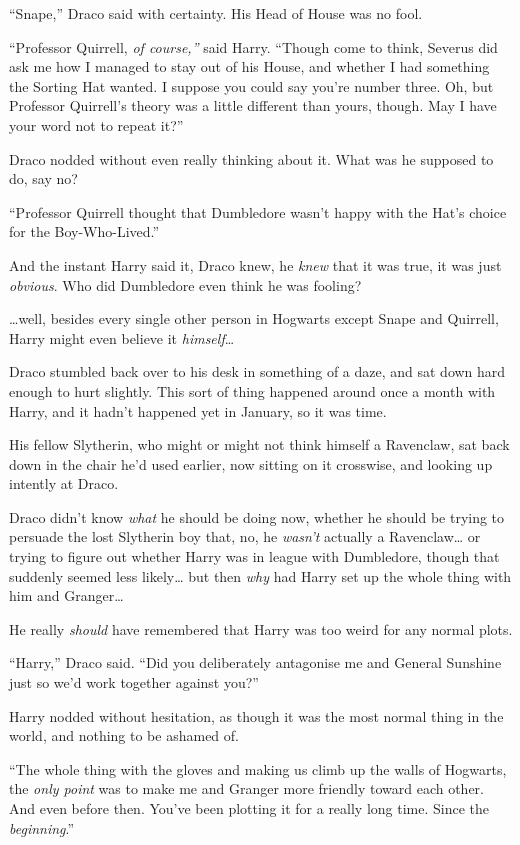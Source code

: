 ``Snape,'' Draco said with certainty. His Head of House was no fool.

``Professor Quirrell, \emph{of course,''} said Harry. ``Though come to
think, Severus did ask me how I managed to stay out of his House, and
whether I had something the Sorting Hat wanted. I suppose you could say
you're number three. Oh, but Professor Quirrell's theory was a little
different than yours, though. May I have your word not to repeat it?''

Draco nodded without even really thinking about it. What was he supposed
to do, say no?

``Professor Quirrell thought that Dumbledore wasn't happy with the Hat's
choice for the Boy-Who-Lived.''

And the instant Harry said it, Draco knew, he \emph{knew} that it was
true, it was just \emph{obvious}. Who did Dumbledore even think he was
fooling?

\ldots{}well, besides every single other person in Hogwarts except Snape
and Quirrell, Harry might even believe it \emph{himself}\ldots{}

Draco stumbled back over to his desk in something of a daze, and sat
down hard enough to hurt slightly. This sort of thing happened around
once a month with Harry, and it hadn't happened yet in January, so it
was time.

His fellow Slytherin, who might or might not think himself a Ravenclaw,
sat back down in the chair he'd used earlier, now sitting on it
crosswise, and looking up intently at Draco.

Draco didn't know \emph{what} he should be doing now, whether he should
be trying to persuade the lost Slytherin boy that, no, he \emph{wasn't}
actually a Ravenclaw\ldots{} or trying to figure out whether Harry was
in league with Dumbledore, though that suddenly seemed less
likely\ldots{} but then \emph{why} had Harry set up the whole thing with
him and Granger\ldots{}

He really \emph{should} have remembered that Harry was too weird for any
normal plots.

``Harry,'' Draco said. ``Did you deliberately antagonise me and General
Sunshine just so we'd work together against you?''

Harry nodded without hesitation, as though it was the most normal thing
in the world, and nothing to be ashamed of.

``The whole thing with the gloves and making us climb up the walls of
Hogwarts, the \emph{only point} was to make me and Granger more friendly
toward each other. And even before then. You've been plotting it for a
really long time. Since the \emph{beginning}.''

